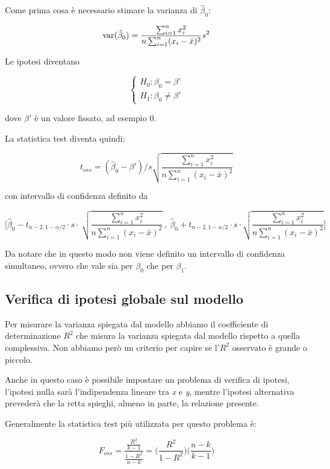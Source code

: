 Come prima cosa è necessario stimare la varianza di $ \hat{\beta}_0 $:

$$
\text{var}(\hat{\beta}_0) = \frac{\sum_{i=1}^{n} x_{i}^2}{n \sum_{i=1}^{n} (x_i - \bar{x})^2}s^2
$$

Le ipotesi diventano

$$
\begin{cases}
H_0 : \beta_0 = \beta' \\
H_1 : \beta_0 \neq \beta' 
\end{cases}
$$

dove $ \beta' $ è un valore fissato, ad esempio 0.

La statistica test diventa quindi:

$$
t_{oss}  = (\hat{\beta}_0 - \beta') \Bigg/ s \sqrt{\frac{\sum_{i=1}^{n} x_{i}^2}{n \sum_{i=1}^{n} (x_i - \bar{x})^2}}
$$

con intervallo di confidenza definito da

$$
\Bigg[ \hat{\beta}_0 - t_{n-2, 1-\alpha/2} \cdot s \cdot \: \sqrt{\frac{\sum_{i=1}^{n} x_{i}^2}{n \sum_{i=1}^{n} (x_i - \bar{x})^2}} \:,\: \hat{\beta}_0 + t_{n-2, 1-\alpha/2}  \cdot s \cdot  \sqrt{\frac{\sum_{i=1}^{n} x_{i}^2}{n \sum_{i=1}^{n} (x_i - \bar{x})^2}}\Bigg]
$$

Da notare che in questo modo non viene definito un intervallo di confidenza simultaneo, ovvero che vale sia per $ \beta_0 $ che per $ \beta_1 $.


\subsection{Verifica di ipotesi globale sul modello}\label{verifica-di-ipotesi-globale-sul-modello}

Per misurare la varianza spiegata dal modello abbiamo il coefficiente di
determinazione $R^2$ che misura la varianza spiegata dal modello
rispetto a quella complessiva. Non abbiamo però un criterio per capire
se l'$R^{2}$ osservato è grande o piccolo.

Anche in questo caso è possibile impostare un problema di verifica di
ipotesi, l'ipotesi nulla sarà l'indipendenza lineare tra \emph{x} e
\emph{y}, mentre l'ipotesi alternativa prevederà che la retta spieghi,
almeno in parte, la relazione presente.

Generalmente la statistica test più utilizzata per questo problema è:

$$
F_{oss} = \frac{\frac{R^2}{k -1}}{\frac{1-R^2}{n-k}} = \Bigg( \frac{R^2}{1-R^2} \Bigg) \Bigg( \frac{n-k}{k-1}\Bigg)
$$

